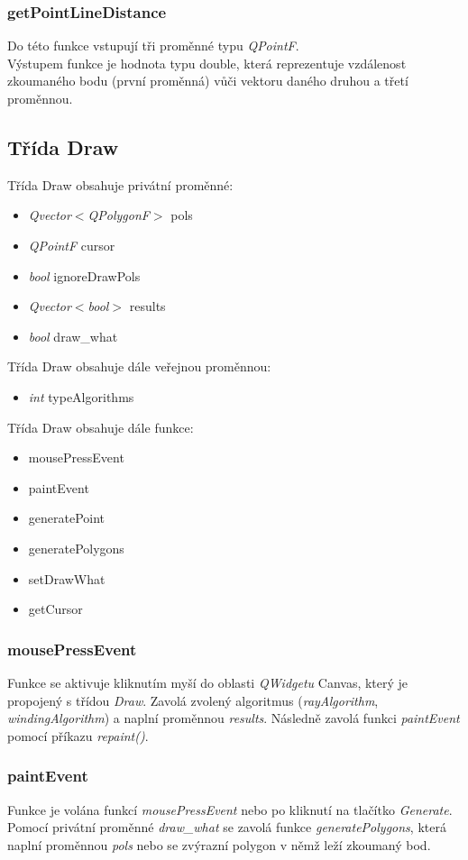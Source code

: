 \documentclass{article}
\begin{document}
\subsubsection{getPointLineDistance}
Do této funkce vstupují tři proměnné typu \emph{QPointF}.\\
Výstupem funkce je hodnota typu double, která reprezentuje vzdálenost zkoumaného bodu (první proměnná) vůči vektoru daného druhou a třetí proměnnou.

\newpage
\subsection{Třída Draw}
Třída Draw obsahuje privátní proměnné:
\begin{itemize}
\item \emph{Qvector$<$QPolygonF$>$} pols
\item \emph{QPointF} cursor
\item \emph{bool} ignoreDrawPols
\item \emph{Qvector$<$bool$>$} results
\item \emph{bool} draw\_what
\end{itemize}

Třída Draw obsahuje dále veřejnou proměnnou:
\begin{itemize}
\item \emph{int} typeAlgorithms
\end{itemize}

Třída Draw obsahuje dále funkce:
\begin{itemize}
\item mousePressEvent
\item paintEvent
\item generatePoint
\item generatePolygons
\item setDrawWhat
\item getCursor
\end{itemize}

\subsubsection{mousePressEvent}
Funkce se aktivuje kliknutím myší do oblasti \emph{QWidgetu} Canvas, který je propojený s třídou \emph{Draw}. Zavolá zvolený algoritmus (\emph{rayAlgorithm},\emph{ windingAlgorithm}) a naplní proměnnou \emph{results}. Následně zavolá funkci \emph{paintEvent} pomocí příkazu \emph{repaint()}.

\subsubsection{paintEvent}
Funkce je volána funkcí \emph{mousePressEvent} nebo po kliknutí na tlačítko \emph{Generate}. Pomocí privátní proměnné \emph{draw\_what} se zavolá funkce \emph{generatePolygons}, která naplní proměnnou \emph{pols} nebo se zvýrazní polygon v němž leží zkoumaný bod.
\end{document}
